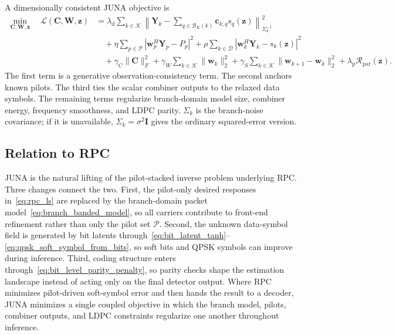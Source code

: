 \documentclass{wileysev}
\begin{document}
	A dimensionally consistent JUNA objective is
	\begin{equation}
		\begin{aligned}
			\min_{\mathbf C,\mathbf W,\mathbf z}\quad
			\mathcal L(\mathbf C,\mathbf W,\mathbf z)
			&=
			\lambda_{\mathrm d}
			\sum_{k\in\mathcal K}
			\left\|
			\mathbf Y_k-
			\sum_{q\in\mathcal B_K(k)}\mathbf c_{k,q}s_q(\mathbf z)
			\right\|_{\Sigma_k^{-1}}^2
			\\
			&\quad+
			\eta\sum_{p\in\mathcal P}
			\left|\mathbf w_p^{H}\mathbf Y_p-P_p\right|^2
			+\rho\sum_{k\in\mathcal D}
			\left|\mathbf w_k^{H}\mathbf Y_k-s_k(\mathbf z)\right|^2
			\\
			&\quad+
			\gamma_C\|\mathbf C\|_F^2
			+\gamma_W\sum_{k\in\mathcal K}\|\mathbf w_k\|_2^2
			+\gamma_S\sum_{k\in\mathcal K}\|\mathbf w_{k+1}-\mathbf w_k\|_2^2
			+\lambda_{\mathrm p}\mathcal R_{\mathrm{par}}(\mathbf z).
		\end{aligned}
		\label{eq:juna_total}
	\end{equation}
	The first term is a generative observation-consistency term. The second anchors known pilots. The third ties the scalar combiner outputs to the relaxed data symbols. The remaining terms regularize branch-domain model size, combiner energy, frequency smoothness, and LDPC parity. \(\Sigma_k\) is the branch-noise covariance; if it is unavailable, \(\Sigma_k=\sigma^2\mathbf I\) gives the ordinary squared-error version.
	
	\subsection{Relation to RPC}
	\label{ssec:juna_interpretation}
	
	JUNA is the natural lifting of the pilot-stacked inverse problem underlying RPC. Three changes connect the two. First, the pilot-only desired responses in~\eqref{eq:rpc_ls} are replaced by the branch-domain packet model~\eqref{eq:branch_banded_model}, so all carriers contribute to front-end refinement rather than only the pilot set \(\mathcal P\). Second, the unknown data-symbol field is generated by bit latents through~\eqref{eq:bit_latent_tanh}--\eqref{eq:qpsk_soft_symbol_from_bits}, so soft bits and QPSK symbols can improve during inference. Third, coding structure enters through~\eqref{eq:bit_level_parity_penalty}, so parity checks shape the estimation landscape instead of acting only on the final detector output. Where RPC minimizes pilot-driven soft-symbol error and then hands the result to a decoder, JUNA minimizes a single coupled objective in which the branch model, pilots, combiner outputs, and LDPC constraints regularize one another throughout inference.
	
\end{document}
